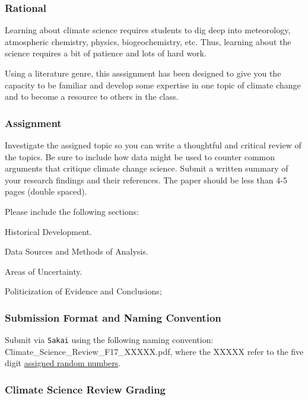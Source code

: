 
\subsubsection{Rational}

Learning about climate science requires students to dig deep into meteorology, atmospheric chemistry, physics, biogeochemistry, etc. Thus, learning about the science requires a bit of patience and lots of hard work. 

Using a literature genre, this asssignment has been designed to give you the capacity to be familiar and develop some expertise in one topic of climate change and to become a resource to others in the class.

\subsubsection{Assignment}

Investigate the assigned topic so you can write a thoughtful and critical review of the topics. Be sure to include how data might be used to counter common arguments that critique climate change science. Submit a written summary of your research findings and their references. The paper should be less than 4-5 pages (double spaced). 

Please include the following sections:

\begin{itemize*}
  \item Historical Development.
  \item Data Sources and Methods of Analysis.
  \item Areas of Uncertainty.
  \item Politicization of Evidence and Conclusions;
\end{itemize*}
 
\subsubsection{Submission Format and Naming Convention}

Submit via \texttt{Sakai} using the following naming convention: Climate\_Science\_Review\_F17\_XXXXX.pdf, where the XXXXX refer to the five digit \href{https://github.com/marclos/Climate_Change_Narratives/raw/master/Admin/RandomNumbers.pdf}{assigned random numbers}.

\subsubsection{Climate Science Review Grading}

